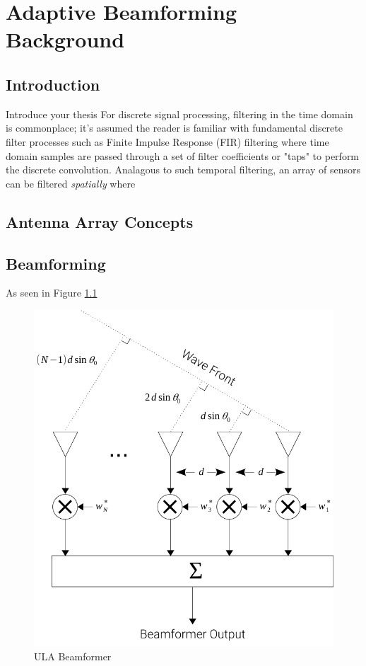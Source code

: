 \chapter{Adaptive Beamforming Background}
\label{chap:abf_background}

\section{Introduction}

Introduce your thesis \citep{Alexander_and_Ghirnikar,Haykin}
For discrete signal processing, filtering in the time domain is commonplace; it's assumed the reader is familiar with fundamental discrete filter processes such as Finite Impulse Response (FIR) filtering where time domain samples are passed through a set of filter coefficients or "taps" to perform the discrete convolution. Analagous to such temporal filtering, an array of sensors can be filtered \emph{spatially} where

\section{Antenna Array Concepts}


\section{Beamforming}

As seen in Figure \ref{fig:ula_beamformer}

\begin{figure}[!htbp]
  \centering
  \includegraphics[]{02_abf_background/ula_beamformer}
  \caption{ULA Beamformer}
  \label{fig:ula_beamformer}
\end{figure}

